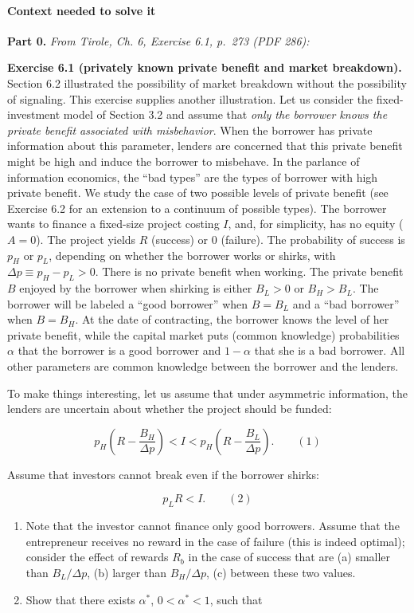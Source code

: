 \documentclass[11pt,a4paper]{article}
\begin{document}
\paragraph{Context needed to solve it}

\textbf{Part 0.} \emph{From Tirole, Ch. 6, Exercise 6.1, p.~273 (PDF 286):}

\textbf{Exercise 6.1 (privately known private benefit and market breakdown).} Section 6.2
illustrated the possibility of market breakdown without the possibility of signaling. This exercise
supplies another illustration. Let us consider the fixed-investment model of Section 3.2 and assume
that \emph{only the borrower knows the private benefit associated with misbehavior}. When the
borrower has private information about this parameter, lenders are concerned that this private
benefit might be high and induce the borrower to misbehave. In the parlance of information
economics, the ``bad types'' are the types of borrower with high private benefit. We study the case
of two possible levels of private benefit (see Exercise 6.2 for an extension to a continuum of
possible types). The borrower wants to finance a fixed-size project costing \(I\), and, for
simplicity, has no equity (\(A = 0\)). The project yields \(R\) (success) or 0 (failure). The
probability of success is \(p_H\) or \(p_L\), depending on whether the borrower works or shirks,
with \(\Delta p \equiv p_H - p_L > 0\). There is no private benefit when working. The private
benefit \(B\) enjoyed by the borrower when shirking is either \(B_L > 0\) or \(B_H > B_L\). The
borrower will be labeled a ``good borrower'' when \(B = B_L\) and a ``bad borrower'' when
\(B = B_H\). At the date of contracting, the borrower knows the level of her private benefit, while
the capital market puts (common knowledge) probabilities \(\alpha\) that the borrower is a good
borrower and \(1 - \alpha\) that she is a bad borrower. All other parameters are common knowledge
between the borrower and the lenders.

To make things interesting, let us assume that under asymmetric information, the lenders are
uncertain about whether the project should be funded:

\[p_H\left(R - \frac{B_H}{\Delta p}\right) < I < p_H\left(R - \frac{B_L}{\Delta p}\right). \qquad (1)\]

Assume that investors cannot break even if the borrower shirks:

\[p_L R < I. \qquad (2)\]

\begin{enumerate}
\def\labelenumi{(\roman{enumi})}
\item
  Note that the investor cannot finance only good borrowers. Assume that the entrepreneur receives
  no reward in the case of failure (this is indeed optimal); consider the effect of rewards \(R_b\)
  in the case of success that are (a) smaller than \(B_L/\Delta p\), (b) larger than
  \(B_H/\Delta p\), (c) between these two values.
\item
  Show that there exists \(\alpha^*\), \(0 < \alpha^* < 1\), such that
\end{enumerate}
\end{document}
